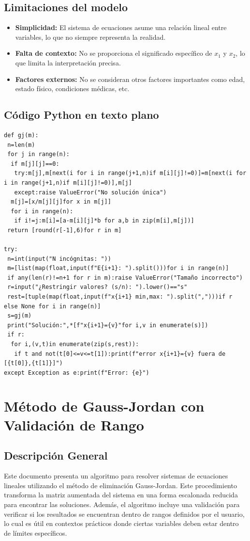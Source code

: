 \documentclass[a4paper,10pt]{article}
\begin{document}
\subsection*{Limitaciones del modelo}
\begin{itemize}
    \item \textbf{Simplicidad:} El sistema de ecuaciones asume una relación lineal entre variables, lo que no siempre representa la realidad.
    \item \textbf{Falta de contexto:} No se proporciona el significado específico de \(x_1\) y \(x_2\), lo que limita la interpretación precisa.
    \item \textbf{Factores externos:} No se consideran otros factores importantes como edad, estado físico, condiciones médicas, etc.
\end{itemize}

\subsection{Código Python en texto plano}
\begin{verbatim}
def gj(m):
 n=len(m)
 for j in range(n):
  if m[j][j]==0:
   try:m[j],m[next(i for i in range(j+1,n)if m[i][j]!=0)]=m[next(i for i in range(j+1,n)if m[i][j]!=0)],m[j]
   except:raise ValueError("No solución única")
  m[j]=[x/m[j][j]for x in m[j]]
  for i in range(n):
   if i!=j:m[i]=[a-m[i][j]*b for a,b in zip(m[i],m[j])]
 return [round(r[-1],6)for r in m]

try:
 n=int(input("N incógnitas: "))
 m=[list(map(float,input(f"E{i+1}: ").split()))for i in range(n)]
 if any(len(r)!=n+1 for r in m):raise ValueError("Tamaño incorrecto")
 r=input("¿Restringir valores? (s/n): ").lower()=="s"
 rest=[tuple(map(float,input(f"x{i+1} min,max: ").split(",")))if r else None for i in range(n)]
 s=gj(m)
 print("Solución:",*[f"x{i+1}={v}"for i,v in enumerate(s)])
 if r:
  for i,(v,t)in enumerate(zip(s,rest)):
   if t and not(t[0]<=v<=t[1]):print(f"error x{i+1}={v} fuera de [{t[0]},{t[1]}]")
except Exception as e:print(f"Error: {e}")
\end{verbatim}






\section{Método de Gauss-Jordan con Validación de Rango}



\subsection{Descripción General}
Este documento presenta un algoritmo para resolver sistemas de ecuaciones lineales utilizando el método de eliminación Gauss-Jordan. Este procedimiento transforma la matriz aumentada del sistema en una forma escalonada reducida para encontrar las soluciones. Además, el algoritmo incluye una validación para verificar si los resultados se encuentran dentro de rangos definidos por el usuario, lo cual es útil en contextos prácticos donde ciertas variables deben estar dentro de límites específicos.
\end{document}
